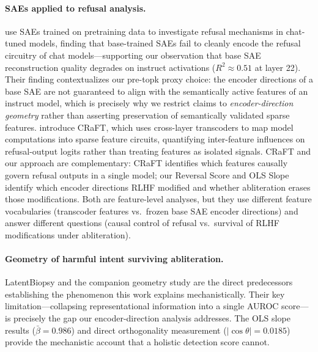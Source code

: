 \documentclass[11pt,letterpaper]{article}
\begin{document}
\paragraph{SAEs applied to refusal analysis.}
\citet{Yeo2025} use SAEs trained on pretraining data to investigate refusal mechanisms in chat-tuned
models, finding that base-trained SAEs fail to cleanly encode the refusal circuitry of chat
models---supporting our observation that base SAE reconstruction quality degrades on instruct
activations ($R^2 \approx 0.51$ at layer 22). Their finding contextualizes our pre-topk proxy choice:
the encoder directions of a base SAE are not guaranteed to align with the semantically active features
of an instruct model, which is precisely why we restrict claims to \emph{encoder-direction geometry}
rather than asserting preservation of semantically validated sparse features. \citet{Kim2026} introduce
CRaFT, which uses cross-layer transcoders to map model computations into sparse feature circuits,
quantifying inter-feature influences on refusal-output logits rather than treating features as isolated
signals. CRaFT and our approach are complementary: CRaFT identifies which features causally govern
refusal outputs in a single model; our Reversal Score and OLS Slope identify which encoder directions
RLHF modified and whether abliteration erases those modifications. Both are feature-level analyses,
but they use different feature vocabularies (transcoder features vs.\ frozen base SAE encoder
directions) and answer different questions (causal control of refusal vs.\ survival of RLHF
modifications under abliteration).

\paragraph{Geometry of harmful intent surviving abliteration.}
LatentBiopsy \citep{LlorenteSaguer2026a} and the companion geometry study \citep{LlorenteSaguer2026b}
are the direct predecessors establishing the phenomenon this work explains mechanistically. Their key
limitation---collapsing representational information into a single AUROC score---is precisely the gap
our encoder-direction analysis addresses. The OLS slope results ($\bar{\beta} = 0.986$) and direct
orthogonality measurement ($|\cos\theta| = 0.0185$) provide the mechanistic account that a holistic
detection score cannot.
\end{document}
